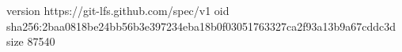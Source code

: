 version https://git-lfs.github.com/spec/v1
oid sha256:2baa0818be24bb56b3e397234eba18b0f03051763327ca2f93a13b9a67cddc3d
size 87540
